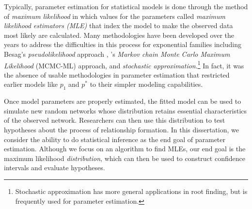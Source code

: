 Typically, parameter estimation for statistical models is done through the method of 
\emph{maximum likelihood} in which values for the parameters called \emph{maximum 
likelihood estimators (MLE)} that index the model to make the observed data most likely 
are calculated.
Many methodologies have been developed over the years to address the difficulties
in this process for exponential families
including Besag's \emph{pseudolikelihood} approach \citep{Besag:1974,Strauss:1990}, 
\citeauthor{Geyer:1992}'s \citeyearpar{Geyer:1992}
\emph{Markov chain Monte Carlo Maximum Likelihood} (MCMC-ML) approach, and 
\emph{stochastic approximation}.\footnote{Stochastic approximation has more general
applications in root finding, but is frequently used for parameter estimation.}
In fact, it was the absence of usable methodologies in parameter estimation that 
restricted earlier models like $p_1$ and $p^*$ to their simpler modeling capabilities.


Once model parameters are properly estimated, the fitted model can be used to simulate 
new random networks whose distribution retains essential characteristics of 
the observed network.  Researchers can then use this distribution 
to test hypotheses about the process of relationship formation.  
In this dissertation, we consider the ability to do statistical inference 
as the end goal of parameter estimation.  
Although we focus on an algorithm to find MLEs, our end goal  
is the maximum likelihood \emph{distribution},  which
can then be used to construct confidence intervals and evaluate hypotheses.



